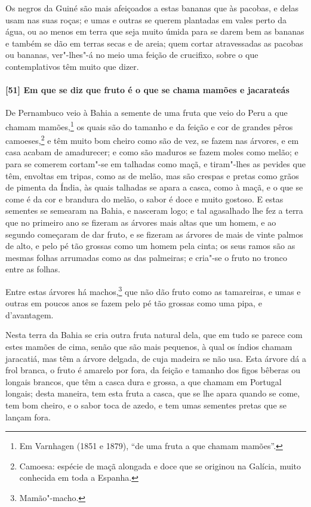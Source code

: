 \begin{linenumbers}
Os negros da Guiné são mais afeiçoados a estas bananas que às pacobas, e delas usam nas
suas roças; e umas e outras se querem plantadas em vales perto da água, ou ao menos em
terra que seja muito úmida para se darem bem as bananas e também se dão em terras secas e
de areia; quem cortar atravessadas as pacobas ou bananas, ver"-lhes"-á no meio uma feição de
crucifixo, sobre o que contemplativos têm muito que dizer.

\paragraph{[51] Em que se diz que fruto é o que se chama mamões e jacarateás}\quad
De Pernambuco veio à Bahia a semente de uma fruta que veio do Peru a que chamam
mamões,\footnote{ Em Varnhagen (1851 e 1879), ``de uma fruta a que chamam mamões''.} os
quais são do tamanho e da feição e cor de grandes pêros camoeses,\footnote{ Camoesa:
espécie de maçã alongada e doce que se originou na Galícia, muito conhecida em toda a
Espanha.} e têm muito bom cheiro como são de vez, se fazem nas árvores, e em casa acabam
de amadurecer; e como são maduros se fazem moles como melão; e para se comerem cortam"-se
em talhadas como maçã, e tiram"-lhes as pevides que têm, envoltas em tripas, como as de
melão, mas são crespas e pretas como grãos de pimenta da Índia, às quais talhadas se apara
a casca, como à maçã, e o que se come é da cor e brandura do melão, o sabor é doce e muito
gostoso. E estas sementes se semearam na Bahia, e nasceram logo; e tal agasalhado lhe fez
a terra que no primeiro ano se fizeram as árvores mais altas que um homem, e ao segundo
começaram de dar fruto, e se fizeram as árvores de mais de vinte palmos de alto, e pelo pé
tão grossas como um homem pela cinta; os seus ramos são as mesmas folhas arrumadas como as
das palmeiras; e cria"-se o fruto no tronco entre as folhas.

Entre estas árvores há machos,\footnote{ Mamão"-macho.} que não dão fruto como as
tamareiras, e umas e outras em poucos anos se fazem pelo pé tão grossas como uma pipa, e
d'avantagem.

Nesta terra da Bahia se cria outra fruta natural dela, que em tudo se parece com estes
mamões de cima, senão que são mais pequenos, à qual os índios chamam jaracatiá, mas têm a
árvore delgada, de cuja madeira se não usa. Esta árvore dá a frol branca, o fruto é
amarelo por fora, da feição e tamanho dos figos bêberas ou longais brancos, que têm a
casca dura e grossa, a que chamam em Portugal longais; desta maneira, tem esta fruta a
casca, que se lhe apara quando se come, tem bom cheiro, e o sabor toca de azedo, e tem
umas sementes pretas que se lançam fora.


\end{linenumbers}
